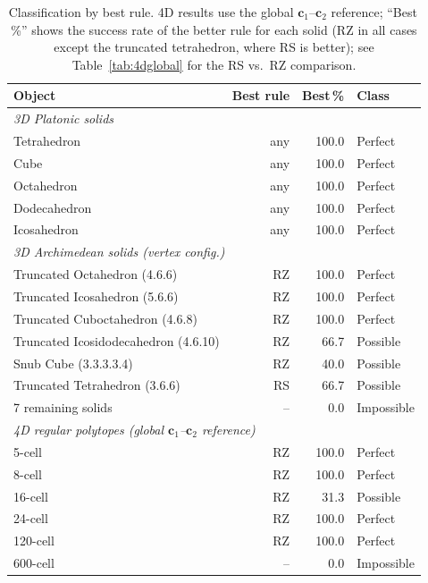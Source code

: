 \documentclass[12pt]{article}
\theoremstyle{definition}
\begin{document}
\begin{table}[ht]
\centering
\caption{Classification by best rule.
  4D results use the global $\mathbf{c}_1$--$\mathbf{c}_2$ reference;
  ``Best\,\%'' shows the success rate of the better rule for each
  solid (RZ in all cases except the truncated tetrahedron, where
  RS is better);
  see Table~\ref{tab:4dglobal} for the RS vs.\ RZ comparison.}
\label{tab:summary}
\renewcommand{\arraystretch}{1.2}
\begin{tabular}{lrrl}
\toprule
Object & Best rule & Best\,\% & Class \\
\midrule
\multicolumn{4}{l}{\textit{3D Platonic solids}} \\
Tetrahedron  & any & 100.0 & Perfect \\
Cube         & any & 100.0 & Perfect \\
Octahedron   & any & 100.0 & Perfect \\
Dodecahedron & any & 100.0 & Perfect \\
Icosahedron  & any & 100.0 & Perfect \\
\multicolumn{4}{l}{\textit{3D Archimedean solids (vertex config.)}} \\
Truncated Octahedron (4.6.6)         & RZ & 100.0 & Perfect \\
Truncated Icosahedron (5.6.6)        & RZ & 100.0 & Perfect \\
Truncated Cuboctahedron (4.6.8)      & RZ & 100.0 & Perfect \\
Truncated Icosidodecahedron (4.6.10) & RZ &  66.7 & Possible \\
Snub Cube (3.3.3.3.4)                & RZ &  40.0 & Possible \\
Truncated Tetrahedron (3.6.6)        & RS &  66.7 & Possible \\
7 remaining solids                   & -- &   0.0 & Impossible \\
\multicolumn{4}{l}{\textit{4D regular polytopes (global $\mathbf{c}_1$--$\mathbf{c}_2$ reference)}} \\
5-cell   & RZ & 100.0 & Perfect \\
8-cell   & RZ & 100.0 & Perfect \\
16-cell  & RZ &  31.3 & Possible \\
24-cell  & RZ & 100.0 & Perfect \\
120-cell & RZ & 100.0 & Perfect \\
600-cell & --  &   0.0 & Impossible \\
\bottomrule
\end{tabular}
\end{table}
\end{document}
